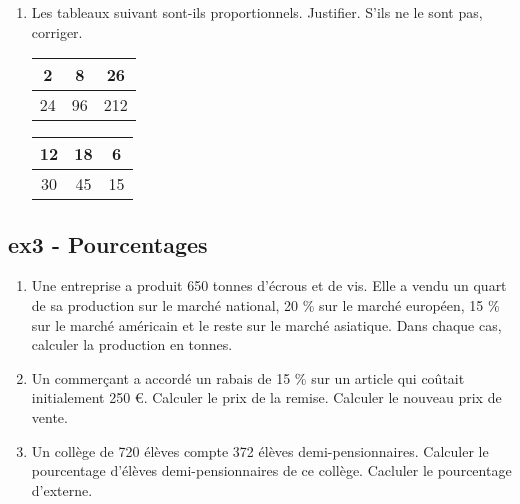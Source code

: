 \documentclass[12pt]{article}
\begin{document}
\begin{enumerate}
\item Les tableaux suivant sont-ils proportionnels. Justifier. S'ils ne le sont pas, corriger.

  \begin{multicols}{2}\noindent
    \vspace{0.4cm}
    \begin{center}
      \begin{tabular}{|c|c|c|}
        \hline
        2 & 8 & 26 \\  \hline
        24 & 96 & 212\\  \hline
      \end{tabular}
    \end{center}
    \vspace{1cm}
    \Pointilles[5]
  \end{multicols}

  \begin{multicols}{2}\noindent
    \vspace{0.4cm}
    \begin{center}
      \begin{tabular}{|c|c|c|}
        \hline
        12 & 18 & 6 \\  \hline
        30 & 45 & 15\\  \hline
      \end{tabular}
    \end{center}
    \vspace{1cm}
    \Pointilles[5]
  \end{multicols}

\end{enumerate}
\newpage
\subsection*{ex3 - Pourcentages}

\begin{enumerate}
\item Une entreprise a produit 650 tonnes d'écrous et de vis. Elle a vendu un quart de sa production sur le marché national, 20 \% sur le marché européen, 15 \% sur le marché américain et le reste sur le marché asiatique. Dans chaque cas, calculer la production en tonnes.
\item Un commerçant a accordé un rabais de 15 \% sur un article qui coûtait initialement 250 \euro. Calculer le prix de la remise. Calculer le nouveau prix de vente.
\item Un collège de 720 élèves compte 372 élèves demi-pensionnaires. Calculer le pourcentage d'élèves demi-pensionnaires de ce collège. Cacluler le pourcentage d'externe. 
\end{enumerate}
\Pointilles[17]
\end{document}
